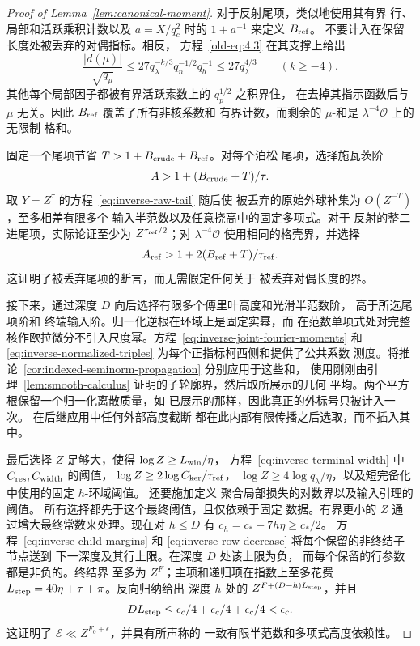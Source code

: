 \documentclass[11pt,a4paper]{article}
\numberwithin{equation}{section}
\numberwithin{figure}{section}
\theoremstyle{definition}
\theoremstyle{remark}
\begin{document}
\begin{proof}[Proof of Lemma~\ref{lem:canonical-moment}]
对于反射尾项，类似地使用其有界
行、局部和活跃乘积计数以及 \(a=X/q_c^2\) 时的 \(1+a^{-1}\) 来定义 \(B_{\rm ref}\)。
不要计入在保留长度处被丢弃的对偶指标。相反，
方程~\eqref{old-eq:4.3} 在其支撑上给出
\[
 \frac{|d(\mu)|}{\sqrt{q_\mu}}
 \le27q_\lambda^{-k/3}q_n^{-1/2}q_b^{-1}
 \le27q_\lambda^{4/3}\qquad(k\ge-4).
\]
其他每个局部因子都被有界活跃素数上的 \(q_p^{1/2}\) 之积界住，
在去掉其指示函数后与 \(\mu\) 无关。因此 \(B_{\rm ref}\) 覆盖了所有非核系数和
有界计数，而剩余的 \(\mu\)-和是 \(\lambda^{-4}\mathcal O\) 上的无限制
格和。

固定一个尾项节省 \(T>1+B_{\rm crude}+B_{\rm ref}\)。对每个泊松
尾项，选择施瓦茨阶
\[
 A>1+(B_{\rm crude}+T)/\tau.
\]
取 \(Y=Z^\tau\) 的方程~\eqref{eq:inverse-raw-tail} 随后使
被丢弃的原始外球补集为 \(O(Z^{-T})\)，至多相差有限多个
输入半范数以及任意挠高中的固定多项式。对于
反射的整二进尾项，实际论证至少为
\(Z^{\tau_{\rm ref}/2}\)；对
\(\lambda^{-4}\mathcal O\) 使用相同的格壳界，并选择
\[
 A_{\rm ref}>1+2(B_{\rm ref}+T)/\tau_{\rm ref}.
\]
这证明了被丢弃尾项的断言，而无需假定任何关于
被丢弃对偶长度的界。

接下来，通过深度 \(D\) 向后选择有限多个傅里叶高度和光滑半范数阶，
高于所选尾项阶和
终端输入阶。归一化逆根在环域上是固定实幂，而
在范数单项式处对完整核作欧拉微分不引入尺度幂。方程~\eqref{eq:inverse-joint-fourier-moments}
和 \eqref{eq:inverse-normalized-triples} 为每个正指标柯西侧和提供了公共系数
测度。将推论~\ref{cor:indexed-seminorm-propagation} 分别应用于这些和，
使用刚刚由引理~\ref{lem:smooth-calculus} 证明的子轮廓界，然后取所展示的几何
平均。两个平方根保留一个归一化离散质量，如
已展示的那样，因此真正的外标号只被计入一次。
在后继应用中任何外部高度截断
都在此内部有限传播之后选取，而不插入其中。

最后选择 \(Z\) 足够大，使得 \(\log Z\ge L_{\rm win}/\eta\)，
方程~\eqref{eq:inverse-terminal-width} 中 \(C_{\rm res},C_{\rm width}\) 的阈值，
\(\log Z\ge2\log C_{\rm ker}/\tau_{\rm ref}\)，
\(\log Z\ge4\log q_\lambda/\eta\)，以及短完备化中使用的固定 \(h\)-环域阈值。
还要施加定义
聚合局部损失的对数界以及输入引理的阈值。
所有选择都先于这个最终阈值，且仅依赖于固定
数据。有界更小的 \(Z\) 通过增大最终常数来处理。现在对 \(h\le D\) 有 \(c_h=c_*-7h\eta\ge c_*/2\)。
方程~\eqref{eq:inverse-child-margins} 和
\eqref{eq:inverse-row-decrease} 将每个保留的非终结子节点送到
下一深度及其行上限。在深度 \(D\) 处该上限为负，
而每个保留的行参数都是非负的。终结界
至多为 \(Z^F\)；主项和递归项在指数上至多花费
\(L_{\rm step}=40\eta+\tau+\pi\)。反向归纳给出
深度 \(h\) 处的 \(Z^{F+(D-h)L_{\rm step}}\)，并且
\[
 D L_{\rm step}\le\epsilon_c/4+\epsilon_c/4+\epsilon_c/4<\epsilon_c.
\]
这证明了 \(\mathcal E\ll Z^{F_0+\epsilon}\)，并具有所声称的
一致有限半范数和多项式高度依赖性。
\end{proof}
\end{document}
